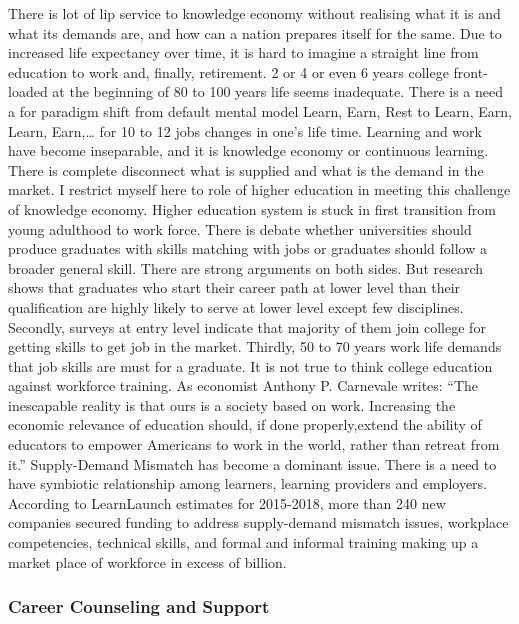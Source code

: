 \documentclass[]{elsarticle} %
\begin{document}
There is lot of lip service to knowledge economy without realising what
it is and what its demands are, and how can a nation prepares itself for
the same. Due to increased life expectancy over time, it is hard to
imagine a straight line from education to work and, finally, retirement.
2 or 4 or even 6 years college front-loaded at the beginning of 80 to
100 years life seems inadequate. There is a need a for paradigm shift
from default mental model Learn, Earn, Rest to Learn, Earn, Learn,
Earn,\ldots{} for 10 to 12 jobs changes in one's life time. Learning and
work have become inseparable, and it is knowledge economy or continuous
learning. There is complete disconnect what is supplied and what is the
demand in the market. I restrict myself here to role of higher education
in meeting this challenge of knowledge economy. Higher education system
is stuck in first transition from young adulthood to work force. There
is debate whether universities should produce graduates with skills
matching with jobs or graduates should follow a broader general skill.
There are strong arguments on both sides. But research shows that
graduates who start their career path at lower level than their
qualification are highly likely to serve at lower level except few
disciplines. Secondly, surveys at entry level indicate that majority of
them join college for getting skills to get job in the market. Thirdly,
50 to 70 years work life demands that job skills are must for a
graduate. It is not true to think college education against workforce
training. As economist Anthony P. Carnevale writes: ``The inescapable
reality is that ours is a society based on work. Increasing the economic
relevance of education should, if done properly,extend the ability of
educators to empower Americans to work in the world, rather than retreat
from it.'' Supply-Demand Mismatch has become a dominant issue. There is
a need to have symbiotic relationship among learners, learning providers
and employers. According to LearnLaunch estimates for 2015-2018, more
than 240 new companies secured funding to address supply-demand mismatch
issues, workplace competencies, technical skills, and formal and
informal training making up a market place of workforce in excess of
billion.

\hypertarget{career-counseling-and-support}{%
\subsubsection{Career Counseling and
Support}\label{career-counseling-and-support}}
\end{document}
